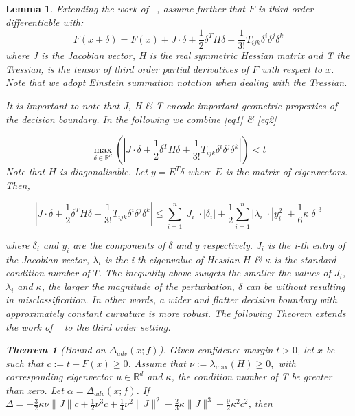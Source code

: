 \documentclass[a4paper,singlecolumn,12pt]{article}
\newtheorem{theorem}{Theorem}[subsection]
\newtheorem{lemma}{Lemma}[subsection]
\begin{document}
\begin{lemma}
Extending the work of ~\cite{yu2018interpreting}, assume further that $F$ is third-order differentiable with:
\begin{equation}\label{eq2}
F(x+\delta) = F(x) + J \cdot \delta+\frac{1}{2} \delta^{T} H \delta + \frac{1}{3!}T_{ijk}\delta^{i}\delta^{j}\delta^{k}
\end{equation}
where J is the Jacobian vector, H is the real symmetric Hessian matrix and T the Tressian, is the tensor of third order partial derivatives of $F$ with respect to $x$. Note that we adopt Einstein summation notation when dealing with the Tressian.

It is important to note that J, H \& T encode important geometric properties of the decision boundary. In the following we combine \ref{eq1} \& \ref{eq2}

\begin{equation}
\max _{\delta \in \mathbb{R}^{d}}\left(\left|J \cdot \delta+\frac{1}{2} \delta^{T} H \delta + \frac{1}{3!}T_{ijk}\delta^{i}\delta^{j}\delta^{k}
\right |\right)<t
\end{equation}
Note that $H$ is diagonalisable. Let $y=E^{T} \delta$ where $E$ is the matrix of eigenvectors. Then, 

$$
\left|J \cdot \delta+\frac{1}{2} \delta^{T} H \delta + \frac{1}{3!}T_{ijk}\delta^{i}\delta^{j}\delta^{k}\right| \leq \sum_{i=1}^{n}\left|J_{i}\right| \cdot\left|\delta_{i}\right|+\frac{1}{2} \sum_{i=1}^{n}\left|\lambda_{i}\right| \cdot\left|y_{i}^{2}\right| + \frac{1}{6}\kappa|\delta|^{3}
$$


\noindent where $\delta_{i}$ and $y_{i}$ are the components of $\delta$ and $y$ respectively.  $J_{i}$ is the i-th entry of the Jacobian vector, $\lambda_{i}$ is the i-th eigenvalue of Hessian $H$ \& $\kappa$ is the standard condition number of $ T$. The inequality above suugets the smaller the values of $J_{i}$, $\lambda_{i}$ and $\kappa$, the larger the magnitude of the perturbation, $\delta$ can be without resulting in misclassification. In other words,  a wider and flatter decision boundary with approximately constant curvature is more robust. The following Theorem extends the work of ~\cite{ moosavidezfooli2018robustness} to the third order setting.
\begin{theorem}[Bound on $\Delta_{adv}(x;f)$]
Given confidence margin $t > 0$, let $x$ be such that $c:=t- F(x) \geq 0$. Assume that $\nu:=\lambda_{\max }(H) \geq 0,$ with corresponding eigenvector $u\in\mathbb{R}^{d}$ and  $\kappa$, the condition number of T be greater than zero. Let $\alpha = \Delta_{adv}(x;f)$. If $\Delta = -\frac{3}{2}\kappa\nu\|J\|c +\frac{1}{2}\nu^{3}c + \frac{1}{4}\nu^{2}\|J\|^{2} -\frac{2}{3}\kappa\|J\|^{3} -\frac{9}{2}\kappa^{2}c^{2}$, then 


\end{theorem}
\end{lemma}
\end{document}
